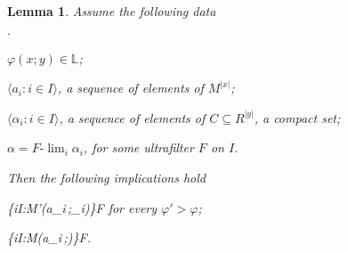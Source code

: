 \documentclass[11pt,oneside]{amsart}
\newcommand{\mylabel}[1]{{#1}\hfill}
\renewenvironment{itemize}
  {\begin{list}{$\cdot$}{%
   \setlength{\parskip}{0mm}
   \setlength{\topsep}{.2\baselineskip}
   \setlength{\rightmargin}{0mm}
   \setlength{\listparindent}{0mm}
   \setlength{\itemindent}{0mm}
   \setlength{\labelwidth}{3ex}
   \setlength{\itemsep}{.2\baselineskip}
   \setlength{\parsep}{.2\baselineskip}
   \setlength{\partopsep}{0mm}
   \setlength{\labelsep}{1ex}
   \setlength{\leftmargin}{\labelwidth+\labelsep}
   \let\makelabel\mylabel}}{%
   \end{list}}
\theoremstyle{plain}
\newtheorem{lemma}[theorem]{Lemma}
\theoremstyle{remark}
\begin{document}
\begin{lemma}\label{lem_HIapprox}
  Assume the following data
  \begin{itemize}
    \item $\varphi(x;y)\in\mathds{L}$;
    \item $\langle a_i:i\in I\rangle$, a sequence of elements of $M^{|x|}$;
    \item $\langle\alpha_i:i\in I\rangle$, a sequence of elements of $C\subseteq R^{|y|}$, a compact set;
    \item $\alpha=F\mbox{-}\lim_i\alpha_i$, for some ultrafilter $F$ on $I$.
  \end{itemize}
  Then the following implications hold

  {\Rightarrow}
  {\big\{i\in I:{\EuScript M}\models\varphi'(a_i\,;\alpha_i)\big\}\in F} for every $\varphi'>\varphi$;

  {\Rightarrow}
  {\big\{i\in I:{\EuScript M}\models\varphi(a_i\,;\alpha)\big\}\in F}.
  
\end{lemma}
\end{document}

